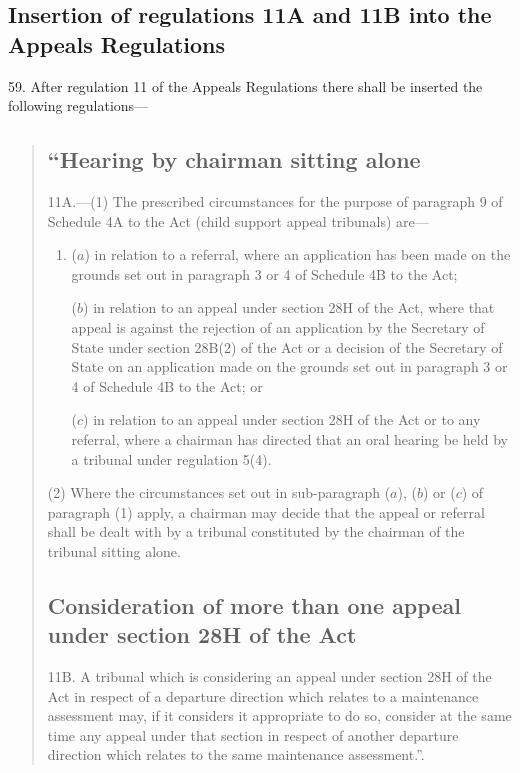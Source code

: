 \documentclass[a4paper]{article}
\begin{document}
\subsection[59. Insertion of regulations 11A and 11B into the Appeals Regulations]{Insertion of regulations 11A and 11B into the Appeals Regulations}

59. After
regulation 11 of the Appeals Regulations there shall be inserted the following
regulations—
\begin{quotation}
\subsection*{“Hearing by chairman sitting alone}

11A.—(1) The prescribed circumstances for the
purpose of paragraph 9 of Schedule 4A to the Act (child support appeal
tribunals) are—
\begin{enumerate}\item[]
($a$) in relation to a referral, where an application has been made on the grounds
set out in paragraph 3 or 4 of Schedule 4B to the Act;

($b$) in relation to an appeal under section 28H of the Act, where that appeal is
against the rejection of an application by the Secretary of State under section
28B(2) of the Act or a decision of the Secretary of State on an application made
on the grounds set out in paragraph 3 or 4 of Schedule 4B to the Act; or

($c$) in relation to an appeal under section 28H of the Act or to any referral,
where a chairman has directed that an oral hearing be held by a tribunal under
regulation 5(4).
\end{enumerate}

(2) Where the circumstances set out in sub-paragraph ($a$), ($b$) or ($c$) of
paragraph (1) apply, a chairman may decide that the appeal or referral shall be
dealt with by a tribunal constituted by the chairman of the tribunal sitting
alone.

\subsection*{Consideration of more than one appeal under section 28H of the Act}

11B. A
tribunal which is considering an appeal under section 28H of the Act in respect
of a departure direction which relates to a maintenance assessment may, if it
considers it appropriate to do so, consider at the same time any appeal under
that section in respect of another departure direction which relates to the same
maintenance assessment.”.
\end{quotation}
\end{document}

